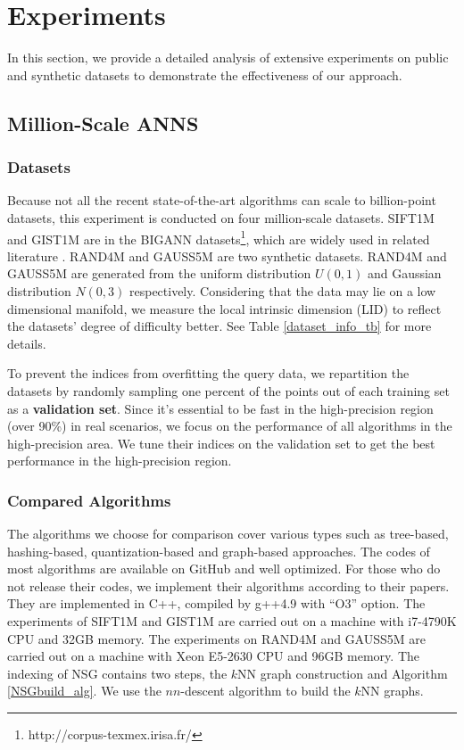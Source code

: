 \documentclass{vldb}
\begin{document}
\section{Experiments}
In this section, we provide a detailed analysis of extensive experiments on public and synthetic datasets to demonstrate the effectiveness of our approach.

\subsection{Million-Scale ANNS}
\subsubsection{Datasets}
Because not all the recent state-of-the-art algorithms can scale to billion-point datasets, this experiment is conducted on four million-scale datasets. SIFT1M and GIST1M are in the BIGANN datasets\footnote{http://corpus-texmex.irisa.fr/}, which are widely used in related literature \cite{jegou2011product, Ben2016Fanng}. RAND4M and GAUSS5M are two synthetic datasets. RAND4M and GAUSS5M are generated from the uniform distribution $U(0, 1)$ and Gaussian distribution $N(0, 3)$ respectively. Considering that the data may lie on a low dimensional manifold, we measure the local intrinsic dimension (LID) \cite{costa2005estimating} to reflect the datasets' degree of difficulty better. See Table \ref{dataset_info_tb} for more details.   

To prevent the indices from overfitting the query data, we repartition the datasets by randomly sampling one percent of the points out of each training set as a \textbf{validation set}. Since it's essential to be fast in the high-precision region (over 90\%) in real scenarios, we focus on the performance of all algorithms in the high-precision area. We tune their indices on the validation set to get the best performance in the high-precision region. 

\subsubsection{Compared Algorithms}

The algorithms we choose for comparison cover various types such as tree-based, hashing-based, quantization-based and graph-based approaches. The codes of most algorithms are available on GitHub and well optimized. For those who do not release their codes, we implement their algorithms according to their papers. They are implemented in C++, compiled by g++4.9 with ``O3'' option. The experiments of SIFT1M and GIST1M are carried out on a machine with i7-4790K CPU and 32GB memory. The experiments on RAND4M and GAUSS5M are carried out on a machine with Xeon E5-2630 CPU and 96GB memory. The indexing of NSG contains two steps, the $k$NN graph construction and Algorithm \ref{NSGbuild_alg}. We use the $nn$-descent algorithm \cite{Dong2011Efficient} to build the $k$NN graphs.
\end{document}
